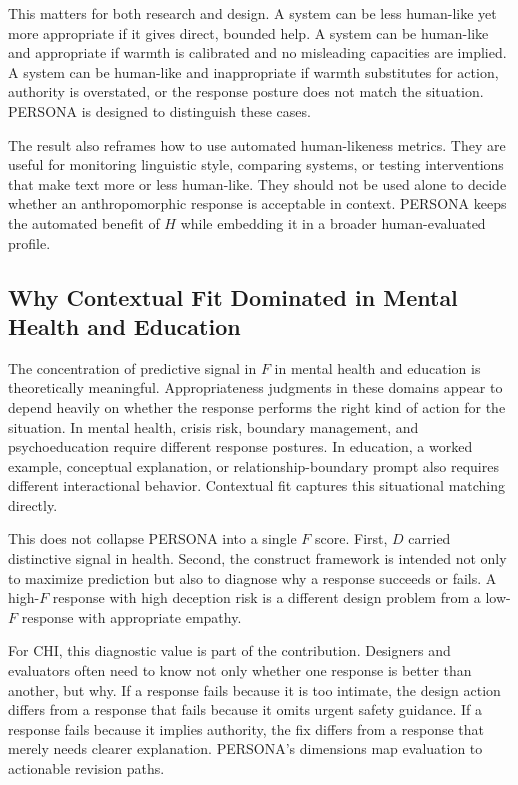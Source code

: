 \documentclass[manuscript,review,anonymous]{acmart}
\begin{document}
This matters for both research and design. A system can be less human-like yet more appropriate if it gives direct, bounded help. A system can be human-like and appropriate if warmth is calibrated and no misleading capacities are implied. A system can be human-like and inappropriate if warmth substitutes for action, authority is overstated, or the response posture does not match the situation. PERSONA is designed to distinguish these cases.

The result also reframes how to use automated human-likeness metrics. They are useful for monitoring linguistic style, comparing systems, or testing interventions that make text more or less human-like. They should not be used alone to decide whether an anthropomorphic response is acceptable in context. PERSONA keeps the automated benefit of $H$ while embedding it in a broader human-evaluated profile.

\subsection{Why Contextual Fit Dominated in Mental Health and Education}
The concentration of predictive signal in $F$ in mental health and education is theoretically meaningful. Appropriateness judgments in these domains appear to depend heavily on whether the response performs the right kind of action for the situation. In mental health, crisis risk, boundary management, and psychoeducation require different response postures. In education, a worked example, conceptual explanation, or relationship-boundary prompt also requires different interactional behavior. Contextual fit captures this situational matching directly.

This does not collapse PERSONA into a single $F$ score. First, $D$ carried distinctive signal in health. Second, the construct framework is intended not only to maximize prediction but also to diagnose why a response succeeds or fails. A high-$F$ response with high deception risk is a different design problem from a low-$F$ response with appropriate empathy.

For CHI, this diagnostic value is part of the contribution. Designers and evaluators often need to know not only whether one response is better than another, but why. If a response fails because it is too intimate, the design action differs from a response that fails because it omits urgent safety guidance. If a response fails because it implies authority, the fix differs from a response that merely needs clearer explanation. PERSONA's dimensions map evaluation to actionable revision paths.
\end{document}
